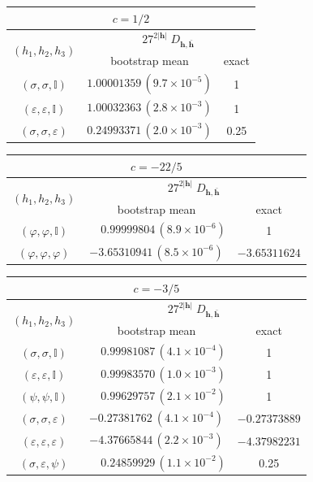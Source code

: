 \documentclass[a4paper,11pt]{article}
\begin{document}
\begin{table}[tbp]
\centering 

\begin{tabular}{|c|c|c|}
\multicolumn{3}{c}{$c=1/2$}\\
\hline 
  \multirow{2}{*}{$(h_1, h_2, h_3)$} &  \multicolumn{2}{c|}{$27^{2|\boldsymbol{h}|}\;D_{\boldsymbol{h}, \boldsymbol{\bar{h}}}$} \\
  \cline{2-3}
                                     &  bootstrap mean & exact \\ 
 \hline
 $(\sigma, \sigma, \mathbb{I})$ & $1.00001359\, (9.7\times 10^{-5})$  &    1   \\
 $(\varepsilon, \varepsilon, \mathbb{I})$ & $1.00032363\, (2.8\times 10^{-3})$  &    1   \\
 $(\sigma, \sigma, \varepsilon)$   & $0.24993371\, (2.0\times 10^{-3})$ & 0.25 \\
 \hline
\end{tabular}
\vspace{0.75cm}

\begin{tabular}{|c|c|c|}
\multicolumn{3}{c}{$c=-22/5$}\\
\hline 
  \multirow{2}{*}{$(h_1, h_2, h_3)$} &  \multicolumn{2}{c|}{$27^{2|\boldsymbol{h}|}\;D_{\boldsymbol{h}, \boldsymbol{\bar{h}}}$} \\
  \cline{2-3} 
                                     & bootstrap mean & exact \\
 \hline
 $(\varphi, \varphi, \mathbb{I})$ &  $\phantom{-}0.99999804\, (8.9\times 10^{-6})$ &   1   \\
 $(\varphi, \varphi, \varphi)$ &    $-3.65310941\, (8.5\times 10^{-6})$ &  $-3.65311624$  \\
 \hline
\end{tabular}
\vspace{0.75cm}

\begin{tabular}{|c|c|c|}
\multicolumn{3}{c}{$c=-3/5$}\\
\hline 
  \multirow{2}{*}{$(h_1, h_2, h_3)$} &  \multicolumn{2}{c|}{$27^{2|\boldsymbol{h}|}\;D_{\boldsymbol{h}, \boldsymbol{\bar{h}}}$} \\
  \cline{2-3} 
                                     & bootstrap mean  & exact \\
 \hline
 $(\sigma, \sigma, \mathbb{I})$ &            $\phantom{-}0.99981087\,(4.1\times10^{-4})$ & 1        \\
 $(\varepsilon, \varepsilon, \mathbb{I})$ &  $\phantom{-}0.99983570\,(1.0\times10^{-3})$ & 1        \\
 $(\psi, \psi, \mathbb{I})$   &              $\phantom{-}0.99629757\,(2.1\times10^{-2})$ & 1 \\
 $(\sigma, \sigma, \varepsilon)$ &           $-0.27381762\ (4.1\times 10^{-4})$          &$-0.27373889$\\
 $(\varepsilon, \varepsilon, \varepsilon)$ & $-4.37665844\, (2.2\times 10^{-3})$         &$-4.37982231$\\
 $(\sigma, \varepsilon, \psi)$ &             $\phantom{-}0.24859929\,(1.1\times 10^{-2})$ & 0.25\\
 \hline
\end{tabular}


\end{table}
\end{document}
